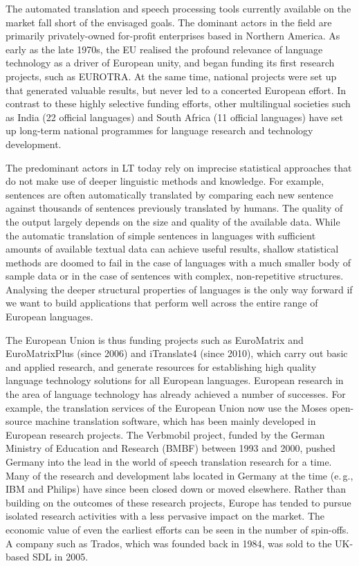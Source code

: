 \begin{multicols}{2}
The automated translation and speech processing tools currently available on the market fall short of the envisaged goals. The dominant actors in the field are primarily privately-owned for-profit enterprises based in Northern America. As early as the late 1970s, the EU realised the profound relevance of language technology as a driver of European unity, and began funding its first research projects, such as EUROTRA. At the same time, national projects were set up that generated valuable results, but never led to a concerted European effort. In contrast to these highly selective funding efforts, other multilingual societies such as India (22 official languages) and South Africa (11 official languages) have set up long-term national programmes for language research and technology development. 

The predominant actors in LT today rely on imprecise statistical approaches that do not make use of deeper linguistic methods and knowledge. For example, sentences are often automatically translated by comparing each new sentence against thousands of sentences previously translated by humans. The quality of the output largely depends on the size and quality of the available  data. While the automatic translation of simple sentences in languages with sufficient amounts of available textual data can achieve useful results, shallow statistical methods are doomed to fail in the case of languages with a much smaller body of sample data or in the case of sentences with complex, non-repetitive structures. Analysing the deeper structural properties of languages is the only way forward if we want to build applications that perform well across the entire range of European languages.


The European Union is thus funding projects such as EuroMatrix and EuroMatrixPlus (since 2006) and iTranslate4 (since 2010), which carry out basic and applied research, and generate resources for establishing high quality language technology solutions for all European languages. 
European research in the area of language technology has already achieved a number of successes. For example, the translation services of the European Union now use the Moses open-source machine translation software, which has been mainly developed in European research projects. The Verbmobil project, funded by the German Ministry of Education and Research (BMBF) between 1993 and 2000, pushed Germany into the lead in the world of speech translation research for a time. Many of the research and development labs located in Germany at the time (e.\,g., IBM and Philips) have since been closed down or moved elsewhere. Rather than building on the outcomes of these research projects, Europe has tended to pursue isolated research activities with a less pervasive impact on the market. The economic value of even the earliest efforts can be seen in the number of spin-offs. A company such as Trados, which was founded back in 1984, was sold to the UK-based SDL in 2005.


\end{multicols}
